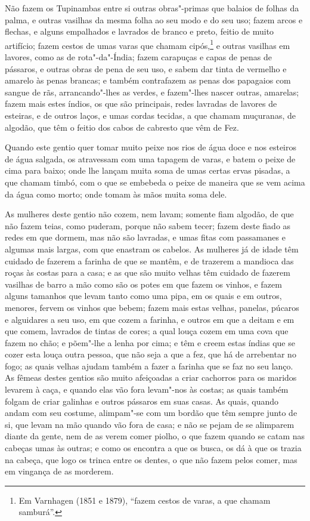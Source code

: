 \begin{linenumbers}
Não fazem os Tupinambas entre si outras obras"-primas que balaios de folhas da palma, e
outras vasilhas da mesma folha ao seu modo e do seu uso; fazem arcos e flechas, e alguns
empalhados e lavrados de branco e preto, feitio de muito artifício; fazem cestos de umas
varas que chamam cipós,\footnote{ Em Varnhagen (1851 e 1879), ``fazem cestos de varas, a
que chamam samburá''.} e outras vasilhas em lavores, como as de rota"-da"-Índia; fazem
carapuças e capas de penas de pássaros, e outras obras de pena de seu uso, e sabem dar
tinta de vermelho e amarelo às penas brancas; e também contrafazem as penas dos papagaios
com sangue de rãs, arrancando"-lhes as verdes, e fazem"-lhes nascer outras, amarelas; fazem
mais estes índios, os que são principais, redes lavradas de lavores de esteiras, e de
outros laços, e umas cordas tecidas, a que chamam muçuranas, de algodão, que têm o feitio
dos cabos de cabresto que vêm de Fez.

Quando este gentio quer tomar muito peixe nos rios de água doce e nos esteiros de água
salgada, os atravessam com uma tapagem de varas, e batem o peixe de cima para baixo; onde
lhe lançam muita soma de umas certas ervas pisadas, a que chamam timbó, com o que se
embebeda o peixe de maneira que se vem acima da água como morto; onde tomam às mãos muita
soma dele.

As mulheres deste gentio não cozem, nem lavam; somente fiam algodão, de que não fazem
teias, como puderam, porque não sabem tecer; fazem deste fiado as redes em que dormem, mas
não são lavradas, e umas fitas com passamanes e algumas mais largas, com que enastram os
cabelos. As mulheres já de idade têm cuidado de fazerem a farinha de que se mantêm, e de
trazerem a mandioca das roças às costas para a casa; e as que são muito velhas têm cuidado
de fazerem vasilhas de barro a mão como são os potes em que fazem os vinhos, e fazem
alguns tamanhos que levam tanto como uma pipa, em os quais e em outros, menores, fervem os
vinhos que bebem; fazem mais estas velhas, panelas, púcaros e alguidares a seu uso, em que
cozem a farinha, e outros em que a deitam e em que comem, lavrados de tintas de cores; a
qual louça cozem em uma cova que fazem no chão; e põem"-lhe a lenha por cima; e têm e creem
estas índias que se cozer esta louça outra pessoa, que não seja a que a fez, que há de
arrebentar no fogo; as quais velhas ajudam também a fazer a farinha que se faz no seu
lanço. As fêmeas destes gentios são muito afeiçoadas a criar cachorros para os maridos
levarem à caça, e quando elas vão fora levam"-nos às costas; as quais também folgam de
criar galinhas e outros pássaros em suas casas. As quais, quando andam com seu costume,
alimpam"-se com um bordão que têm sempre junto de si, que levam na mão quando vão fora de
casa; e não se pejam de se alimparem diante da gente, nem de as verem comer piolho, o que
fazem quando se catam nas cabeças umas às outras; e como os encontra a que os busca, os dá
à que os trazia na cabeça, que logo os trinca entre os dentes, o que não fazem pelos
comer, mas em vingança de as morderem.


\end{linenumbers}
